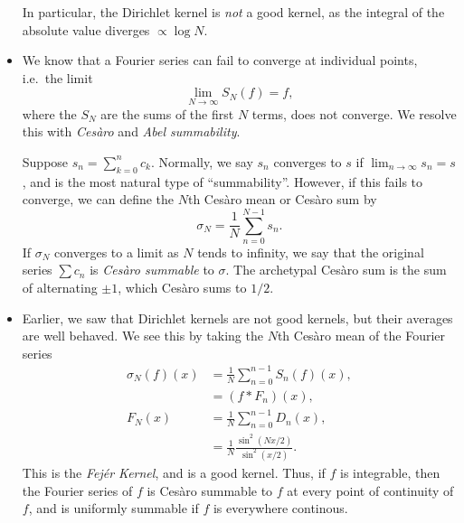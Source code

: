 \documentclass[11pt,
        usenames, %
        dvipsnames %
    ]{report}
\begin{document}
\begin{itemize}
        In particular, the Dirichlet kernel is \emph{not} a good kernel, as the
        integral of the absolute value diverges $\propto \log N$.

    \item We know that a Fourier series can fail to converge at individual
        points, i.e.\ the limit
        \begin{equation}
            \lim_{N \to \infty}S_N(f) = f,
        \end{equation}
        where the $S_N$ are the sums of the first $N$ terms, does not converge.
        We resolve this with \emph{Ces\`aro} and \emph{Abel summability}.

        Suppose $s_n = \sum\limits_{k = 0}^n c_k$. Normally, we say $s_n$
        converges to $s$ if $\lim_{n \to \infty} s_n = s$, and is the most
        natural type of ``summability''. However, if this fails to converge, we
        can define the $N$th Ces\`aro mean or Ces\`aro sum by
        \begin{equation}
            \sigma_N = \frac{1}{N}\sum\limits_{n = 0}^{N - 1}s_n.
        \end{equation}
        If $\sigma_N$ converges to a limit as $N$ tends to infinity, we say that
        the original series $\sum\limits c_n$ is \emph{Ces\`aro summable} to
        $\sigma$. The archetypal Ces\`aro sum is the sum of alternating $\pm 1$,
        which Ces\`aro sums to $1/2$.

    \item Earlier, we saw that Dirichlet kernels are not good kernels, but their
        averages are well behaved. We see this by taking the $N$th Ces\`aro mean
        of the Fourier series
        \begin{align}
            \sigma_N(f)(x) &= \frac{1}{N}\sum\limits_{n = 0}^{n - 1}S_n(f)(x)
                    ,\\
                &= (f * F_n)(x),\\
            F_N(x) &= \frac{1}{N}\sum\limits_{n = 0}^{n - 1}
                D_{n}(x),\\
                &= \frac{1}{N}\frac{\sin^2(Nx/2)}{\sin^2(x/2)}.
        \end{align}
        This is the \emph{Fej\'er Kernel}, and is a good kernel. Thus, if $f$ is
        integrable, then the Fourier series of $f$ is Ces\`aro summable to $f$
        at every point of continuity of $f$, and is uniformly summable if $f$ is
        everywhere continous.


\end{itemize}
\end{document}
